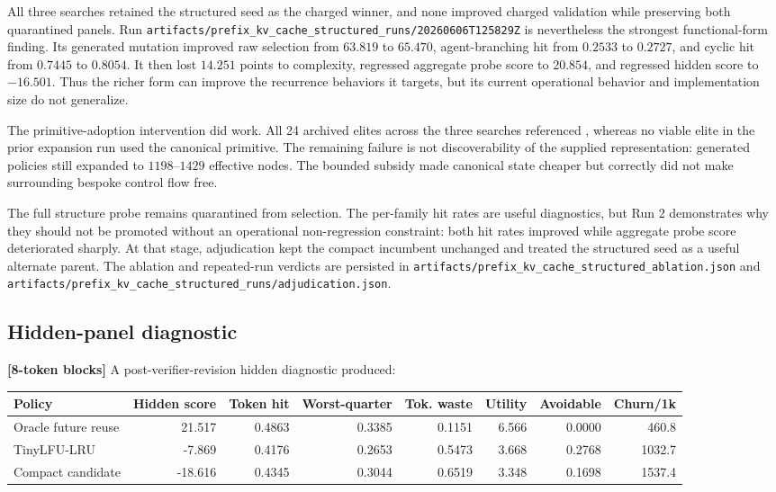 \documentclass[11pt]{article}
\newcommand{\code}[1]{\texttt{\detokenize{#1}}}
\newcommand{\filepath}[1]{\nolinkurl{#1}}
\newcommand{\blocktag}[1]{\textbf{\color{navy}[#1-token blocks]}}
\begin{document}
All three searches retained the structured seed as the charged winner, and none
improved charged validation while preserving both quarantined panels.  Run
\filepath{artifacts/prefix_kv_cache_structured_runs/20260606T125829Z} is nevertheless
the strongest functional-form finding.  Its generated mutation improved raw selection
from \(63.819\) to \(65.470\), agent-branching hit from \(0.2533\) to \(0.2727\), and
cyclic hit from \(0.7445\) to \(0.8054\).  It then lost \(14.251\) points to complexity,
regressed aggregate probe score to \(20.854\), and regressed hidden score to
\(-16.501\).  Thus the richer form can improve the recurrence behaviors it targets,
but its current operational behavior and implementation size do not generalize.

The primitive-adoption intervention did work.  All 24 archived elites across the
three searches referenced \code{MultiTimescaleDecay.observe_vector}, whereas no viable
elite in the prior expansion run used the canonical primitive.  The remaining failure
is not discoverability of the supplied representation: generated policies still
expanded to \(1198\)--\(1429\) effective nodes.  The bounded subsidy made canonical
state cheaper but correctly did not make surrounding bespoke control flow free.

The full structure probe remains quarantined from selection.  The per-family hit rates
are useful diagnostics, but Run 2 demonstrates why they should not be promoted without
an operational non-regression constraint: both hit rates improved while aggregate
probe score deteriorated sharply.  At that stage, adjudication kept
the compact incumbent unchanged and treated the structured seed as a useful alternate
parent.  The ablation and repeated-run verdicts are persisted in
\filepath{artifacts/prefix_kv_cache_structured_ablation.json} and
\filepath{artifacts/prefix_kv_cache_structured_runs/adjudication.json}.

\subsection{Hidden-panel diagnostic}

\blocktag{8} A post-verifier-revision hidden diagnostic produced:

\begin{center}
\small
\scriptsize
\begin{tabular}{lrrrrrrr}
\toprule
\textbf{Policy} & \textbf{Hidden score} & \textbf{Token hit} &
\textbf{Worst-quarter} & \textbf{Tok. waste} & \textbf{Utility} &
\textbf{Avoidable} & \textbf{Churn/1k} \\
\midrule
Oracle future reuse & 21.517 & 0.4863 & 0.3385 & 0.1151 & 6.566 & 0.0000 & 460.8 \\
TinyLFU-LRU & -7.869 & 0.4176 & 0.2653 & 0.5473 & 3.668 & 0.2768 & 1032.7 \\
Compact candidate & -18.616 & 0.4345 & 0.3044 & 0.6519 & 3.348 & 0.1698 & 1537.4 \\
\bottomrule
\end{tabular}
\end{center}
\end{document}
